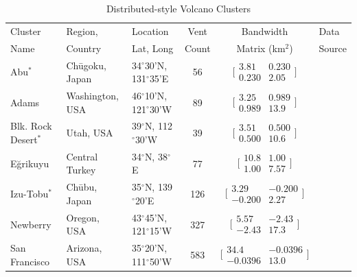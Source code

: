 \documentclass[12pt,letter]{article}
\begin{document}
\begin{table}
\centering
\caption{Distributed-style Volcano Clusters}
\begin{tabular}{p{2cm} p{2.5cm} p{2cm} c c p{4cm}}
\toprule
Cluster	&	Region, &	Location	&	Vent &	Bandwidth	&	Data\\
Name		& Country	&	Lat, Long	&	Count	&	Matrix (km$^2$)	&Source\\
\midrule
Abu$^*$		&	Ch\={u}goku, Japan	&	34$^{\circ}$30'N, 131$^{\circ}$35'E	&	56	&	$\bigl[\begin{smallmatrix} 3.81&0.230\\0.230&2.05 \end{smallmatrix}\bigr]$	&	\citet{kiyosugi2012relationship,kiyosugi2010relationships}\\
Adams		&	Washington, USA	&	46$^{\circ}$10'N, 121$^{\circ}$30'W	&	89	&	$\bigl[\begin{smallmatrix} 3.25&0.989\\0.989&13.9 \end{smallmatrix}\bigr]$	&	\citet{barron2014database}\\
Blk. Rock Desert$^*$ &	Utah, USA		&	39$^{\circ}$N, 112$^{\circ}$30'W&	39	&	$\bigl[\begin{smallmatrix} 3.51&0.500\\0.500&10.6 \end{smallmatrix}\bigr]$	&	\citet{kiyosugi2012relationship,hintz2008physical}\\
E\u{g}rikuyu	&	Central Turkey	&	34$^{\circ}$N, 38$^{\circ}$E	&	77	&	$\bigl[\begin{smallmatrix} 10.8&1.00\\1.00&7.57 \end{smallmatrix}\bigr]$	&	\citet{uslular2015size}\\
Izu-Tobu$^*$	&	Ch\={u}bu, Japan	&	35$^{\circ}$N, 139$^{\circ}$20'E	&	126	&	$\bigl[\begin{smallmatrix} 3.29&-0.200\\-0.200&2.27 \end{smallmatrix}\bigr]$	&	\citet{kiyosugi2012relationship}\\
Newberry	&	Oregon, USA	&	43$^{\circ}$45'N, 121$^{\circ}$15'W	&	327	&	$\bigl[\begin{smallmatrix} 5.57&-2.43\\-2.43&17.3 \end{smallmatrix}\bigr]$	&	\citet{bard2013database}\\
San \mbox{Francisco}	&	Arizona, USA	&	35$^{\circ}$20'N, 111$^{\circ}$50'W	&	583	&	$\bigl[\begin{smallmatrix} 34.4&-0.0396\\-0.0396&13.0 \end{smallmatrix}\bigr]$	&	\citet{harburger2014probabilistic}\\

\end{tabular}
\end{table}
\end{document}
